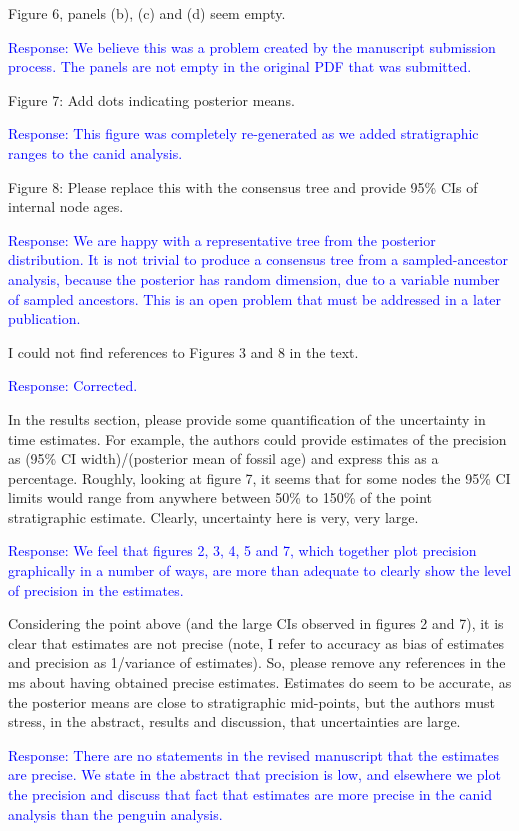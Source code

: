 \documentclass[11pt]{article}
\newcommand{\response}[1]{\medskip{}\textcolor{blue}{{Response: #1}}\medskip{}}
\begin{document}
Figure 6, panels (b), (c) and (d) seem empty.

\response{We believe this was a problem created by the manuscript submission process. The panels are not empty in the original PDF that was submitted.}

Figure 7: Add dots indicating posterior means.

\response{This figure was completely re-generated as we added stratigraphic ranges to the canid analysis.}

Figure 8: Please replace this with the consensus tree and provide 95\% CIs of internal node ages.

\response{We are happy with a representative tree from the posterior distribution. It is not trivial to produce a consensus tree from a sampled-ancestor analysis, because the posterior has random dimension, due to a variable number of sampled ancestors. This is an open problem that must be addressed in a later publication.} 

I could not find references to Figures 3 and 8 in the text.

\response{Corrected.}

In the results section, please provide some quantification of the uncertainty in time estimates. For example,  the authors could provide estimates of the precision as (95\% CI width)/(posterior mean of fossil age) and express this as a percentage. Roughly, looking at figure 7, it seems that for some nodes the 95\% CI limits would range from anywhere between 50\% to 150\% of the point stratigraphic estimate. Clearly, uncertainty here is very, very large. 

\response{We feel that figures 2, 3, 4, 5 and 7, which together plot precision graphically in a number of ways, are more than adequate to clearly show the level of precision in the estimates.}

Considering the point above (and the large CIs observed in figures 2 and 7), it is clear that estimates are not precise (note, I refer to accuracy as bias of estimates and precision as 1/variance of estimates). So, please remove any references in the ms about having obtained precise estimates. Estimates do seem to be accurate, as the posterior means are close to stratigraphic mid-points, but the authors must stress, in the abstract, results and discussion, that uncertainties are large.

\response{There are no statements in the revised manuscript that the estimates are precise. We state in the abstract that precision is low, and elsewhere we plot the precision and discuss that fact that estimates are more precise in the canid analysis than the penguin analysis.}
\end{document}

